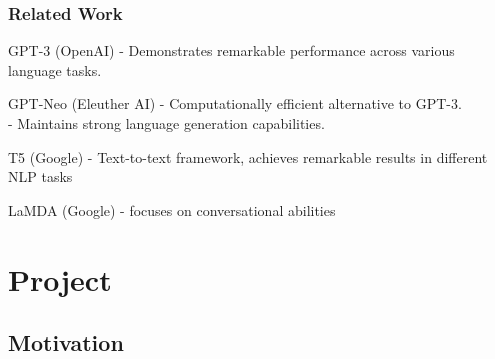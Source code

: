 \documentclass[10pt]{beamer}
\begin{document}
\begin{frame}
\frametitle{Related Work}
\begin{block}{GPT-3 (OpenAI)}
- Demonstrates remarkable performance across various language tasks.
\end{block}

\begin{block}{GPT-Neo (Eleuther AI)}
- Computationally efficient alternative to GPT-3.\\
- Maintains strong language generation capabilities.
\end{block}

\begin{block}{T5 (Google)}
- Text-to-text framework, achieves remarkable results in different NLP tasks
\end{block}

\begin{block}{LaMDA (Google)}
- focuses on conversational abilities
\end{block}
\end{frame}





\section{Project}%


\subsection{Motivation} %
\end{document}
